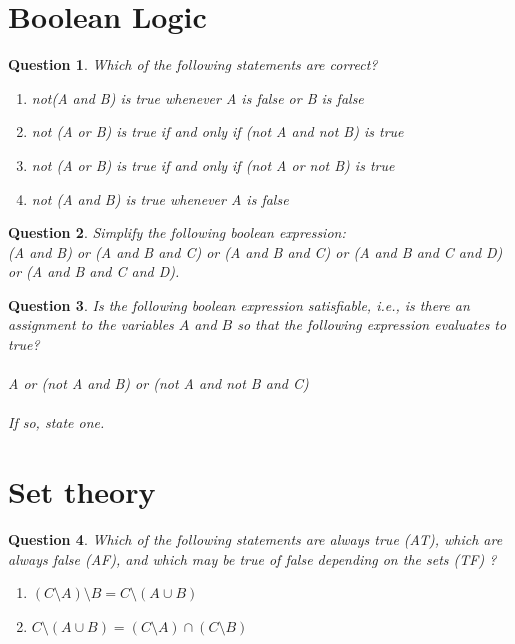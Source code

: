 \documentclass[13pt,a4paper]{article}
\newtheorem{question}{Question}
\begin{document}
\section{Boolean Logic}


\begin{question}
Which of the following statements are correct?
\begin{enumerate}
\item
not(A and B) is true whenever A is false or B is false
\item
not (A or B) is true if and only if (not A and not B) is true
\item
not (A or B) is true if and only if  (not A or not B) is true
\item
not (A and B) is true whenever A is false
\end{enumerate}
\end{question}

\begin{question}
Simplify the following boolean expression: \\
(A and B) or (A and B and C) or (A and B and C) or (A and B and C and D) or (A and B and C and D).
\end{question}


\begin{question}
Is the following boolean expression satisfiable, i.e., is there an assignment to the variables $A$ and $B$ 
so that the following expression evaluates to true?  \\
\\
A or (not A and B) or (not A and not B and C)\\
\\
  If so, state one.
\end{question}


\section{Set theory}

\begin{question}
Which of the following statements are always true (AT), which are always false (AF), and which may be true of false depending on the sets (TF) ?
\begin{enumerate}
\item
$(C \setminus A) \setminus B = C \setminus (A \cup B)$
\item
$ C \setminus (A \cup B) = (C \setminus A)  \cap (C \setminus B)$
\end{enumerate}
\end{question}
\end{document}

